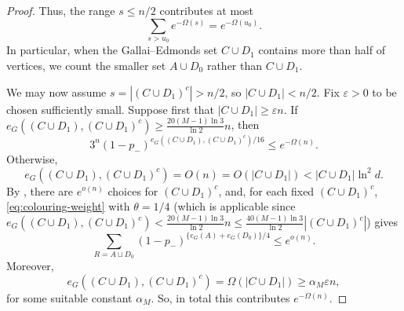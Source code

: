 \documentclass[10pt,a4paper]{article}
\begin{document}
\begin{proof}
Thus, the range $s \leq n/2$ contributes at most
\begin{equation}\label{eq:small-side-sum}
 \sum_{s>u_0}e^{-\Omega(s)}=e^{-\Omega(u_0)}.
\end{equation}
In particular, when the Gallai--Edmonds set $C \cup D_1$ contains more than half of vertices, we count the smaller set $A\cup D_0$ rather than $C \cup D_1$.

We may now assume $s=|(C \cup D_1)^c|>n/2$, so $|C \cup D_1|<n/2$.
Fix $\varepsilon>0$ to be chosen sufficiently small. Suppose first that $|C \cup D_1|\ge\varepsilon n$.
If $e_G((C \cup D_1), (C \cup D_1)^c)\ge \frac{20(M-1) \ln 3}{\ln 2}n$, then
\[
 3^n (1-p_-)^{e_G((C \cup D_1), (C \cup D_1)^c)/16}\le e^{-\Omega(n)}.
\]
Otherwise,
\[
 e_G((C \cup D_1), (C \cup D_1)^c)=O(n)=O(|C \cup D_1|)< |C \cup D_1|\ln^2 d.
\]
By , there are $e^{o(n)}$ choices for $(C \cup D_1)^c$, and, for each fixed $(C \cup D_1)^c$, \eqref{eq:colouring-weight} with $\theta=1/4$ (which is applicable since $e_G((C \cup D_1), (C \cup D_1)^c)<\frac{20(M-1) \ln 3}{\ln 2}n\le\frac{40(M-1) \ln 3}{\ln 2}|(C \cup D_1)^c|$) gives
\[
 \sum_{R=A\sqcup D_0}
 (1-p_-)^{\{e_G(A)+e_G(D_0)\}/4}\le e^{o(n)}.
\]
Moreover,
\[
 e_G((C \cup D_1), (C \cup D_1)^c)=\Omega(|C \cup D_1|)\ge \alpha_M\varepsilon n,
\]
for some suitable constant $\alpha_M$.
So, in total this contributes $e^{-\Omega(n)}$.


\end{proof}
\end{document}
